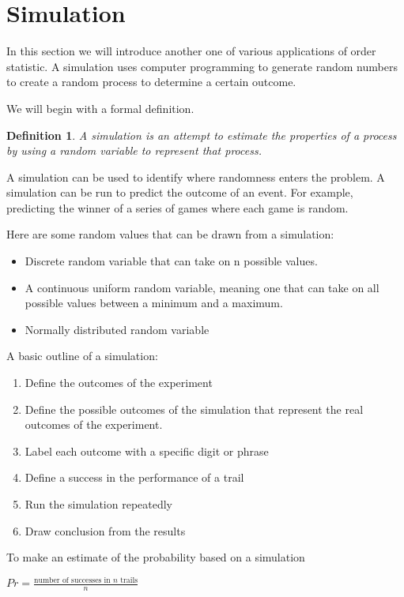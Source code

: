 \documentclass[11pt,a4paper]{article}
\theoremstyle{plain}
\newtheorem{de}[fact]{Definition}
\begin{document}
\newpage
\section{Simulation}
In this section we will introduce another one of various applications of order statistic. A simulation uses computer programming to generate random numbers to create a random process to determine a certain outcome.

We will begin with a formal definition. 
\begin{de}
A simulation is an attempt to estimate the properties of a process by using a random variable to represent that process.
\end{de}

A simulation can be used to identify where randomness enters the problem. A simulation can be run to predict the outcome of an event. For example, predicting the winner of a series of games where each game is random. 

Here are some random values that can be drawn from a simulation: 
\begin{itemize}
  \item Discrete random variable that can take on n possible values.
  \item  A continuous uniform random variable, meaning one that can take on all possible values between a minimum and a maximum.
  \item  Normally distributed random variable
\end{itemize}


A basic outline of a simulation:
\begin{enumerate}
  \item Define the outcomes of the experiment
  \item Define the possible outcomes of the simulation that represent the real outcomes of the experiment.
  \item Label each outcome with a specific digit or phrase
  \item Define a success in the performance of a trail
  \item Run the simulation repeatedly
  \item Draw conclusion from the results
\end{enumerate}

To make an estimate of the probability based on a simulation
\begin{center}
$Pr=\frac{\text{number of successes in $n$ trails}}{n}$
\end{center}
\end{document}

